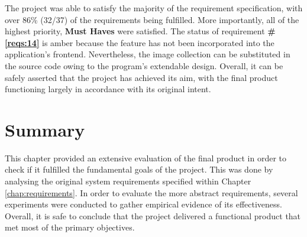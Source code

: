 \documentclass{l4proj}
\begin{document}
The project was able to satisfy the majority of the requirement specification, with over 86\% (32/37) of the requirements being fulfilled. More importantly, all of the highest priority, \textbf{Must Haves} were satisfied. The status of requirement \textbf{\#\ref{reqs:14}} is amber because the feature has not been incorporated into the application's frontend. Nevertheless, the image collection can be substituted in the source code owing to the program's extendable design. Overall, it can be safely asserted that the project has achieved its aim, with the final product functioning largely in accordance with its original intent.


\section{Summary}
This chapter provided an extensive evaluation of the final product in order to check if it fulfilled the fundamental goals of the project. This was done by analysing the original system requirements specified within Chapter \ref{chap:requirements}. In order to evaluate the more abstract requirements, several experiments were conducted to gather empirical evidence of its effectiveness. Overall, it is safe to conclude that the project delivered a functional product that met most of the primary objectives. 



\end{document}
